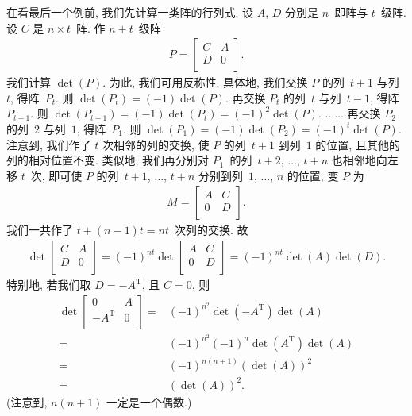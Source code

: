 在看最后一个例前, 我们先计算一类阵的行列式.
设 \(A\), \(D\) 分别是 \(n\)~即阵与 \(t\)~级阵.
设 \(C\) 是 \(n \times t\)~阵.
作 \(n + t\)~级阵
\begin{align*}
    P = \begin{bmatrix}
            C & A \\
            D & 0 \\
        \end{bmatrix}.
\end{align*}
我们计算 \(\det {(P)}\).
为此, 我们可用反称性.
具体地, 我们交换 \(P\) 的列~\(t+1\) 与列~\(t\),
得阵~\(P_t\).
则 \(\det {(P_t)} = (-1) \det {(P)}\).
再交换 \(P_t\) 的列~\(t\) 与列~\(t-1\),
得阵~\(P_{t-1}\).
则 \(\det {(P_{t-1})} = (-1) \det {(P_t)}
= (-1)^2 \det {(P)}\).
\(\dots \dots\)
再交换 \(P_2\) 的列~\(2\) 与列~\(1\),
得阵~\(P_1\).
则 \(\det {(P_1)} = (-1) \det {(P_2)}
= (-1)^t \det {(P)}\).
注意到, 我们作了 \(t\) 次相邻的列的交换,
使 \(P\) 的列~\(t+1\) 到列~\(1\) 的位置,
且其他的列的相对位置不变.
类似地, 我们再分别对 \(P_1\)~的列~\(t+2\), \(\dots\), \(t+n\)
也相邻地向左移 \(t\)~次,
即可使 \(P\) 的列~\(t+1\), \(\dots\), \(t+n\)
分别到列~\(1\), \(\dots\), \(n\) 的位置,
变 \(P\) 为
\begin{align*}
    M = \begin{bmatrix}
            A & C \\
            0 & D \\
        \end{bmatrix}.
\end{align*}
我们一共作了 \(t + (n-1)t = nt\)~次列的交换.
故
\begin{align*}
    \det {
        \begin{bmatrix}
            C & A \\
            D & 0 \\
        \end{bmatrix}
    }
    = (-1)^{nt} \det {
        \begin{bmatrix}
            A & C \\
            0 & D \\
        \end{bmatrix}
    }
    = (-1)^{nt} \det {(A)} \det {(D)}.
\end{align*}
特别地, 若我们取 \(D = -A^{\mathrm{T}}\),
且 \(C = 0\),
则
\begin{align*}
    \det {
        \begin{bmatrix}
            0               & A \\
            -A^{\mathrm{T}} & 0 \\
        \end{bmatrix}
    }
    = {} &
    (-1)^{n^2} \det {(-A^{\mathrm{T}})} \det {(A)}
    \\
    = {} &
    (-1)^{n^2} (-1)^n \det {(A^{\mathrm{T}})} \det {(A)}
    \\
    = {} &
    (-1)^{n(n+1)} (\det {(A)})^2
    \\
    = {} &
    (\det {(A)})^2.
\end{align*}
(注意到, \(n(n+1)\) 一定是一个偶数.)

